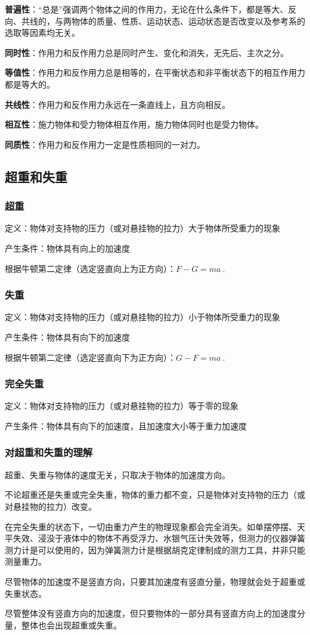\textbf{普遍性}：“总是”强调两个物体之间的作用力，无论在什么条件下，都是等大、反向、共线的，与两物体的质量、性质、运动状态、运动状态是否改变以及参考系的选取等因素均无关。

\textbf{同时性}：作用力和反作用力总是同时产生、变化和消失，无先后、主次之分。

\textbf{等值性}：作用力和反作用力总是相等的，在平衡状态和非平衡状态下的相互作用力都是等大的。

\textbf{共线性}：作用力和反作用力永远在一条直线上，且方向相反。

\textbf{相互性}：施力物体和受力物体相互作用，施力物体同时也是受力物体。

\textbf{同质性}：作用力和反作用力一定是性质相同的一对力。

\subsection{超重和失重}

\subsubsection{超重}

定义：物体对支持物的压力（或对悬挂物的拉力）大于物体所受重力的现象

产生条件：物体具有向上的加速度

根据牛顿第二定律（选定竖直向上为正方向）：$F-G=ma~.$

\subsubsection{失重}

定义：物体对支持物的压力（或对悬挂物的拉力）小于物体所受重力的现象

产生条件：物体具有向下的加速度

根据牛顿第二定律（选定竖直向下为正方向）：$G-F=ma~.$

\subsubsection{完全失重}

定义：物体对支持物的压力（或对悬挂物的拉力）等于零的现象

产生条件：物体具有向下的加速度，且加速度大小等于重力加速度

\subsubsection{对超重和失重的理解}

超重、失重与物体的速度无关，只取决于物体的加速度方向。

不论超重还是失重或完全失重，物体的重力都不变，只是物体对支持物的压力（或对悬挂物的拉力）改变。

在完全失重的状态下，一切由重力产生的物理现象都会完全消失。如单摆停摆、天平失效、浸没于液体中的物体不再受浮力、水银气压计失效等，但测力的仪器弹簧测力计是可以使用的，因为弹簧测力计是根据胡克定律制成的测力工具，并非只能测量重力。

尽管物体的加速度不是竖直方向，只要其加速度有竖直分量，物理就会处于超重或失重状态。

尽管整体没有竖直方向的加速度，但只要物体的一部分具有竖直方向上的加速度分量，整体也会出现超重或失重。
